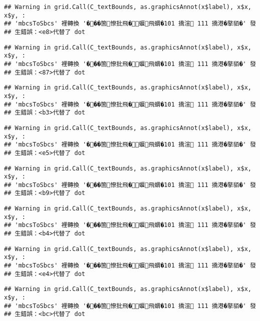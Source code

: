\documentclass[
]{article}
\begin{document}
\begin{verbatim}
## Warning in grid.Call(C_textBounds, as.graphicsAnnot(x$label), x$x, x$y, :
## 'mbcsToSbcs' 裡轉換 '���箇憭批飛�蝘飛蝟�101 撟渲 111 撟港�摮貊�' 發
## 生錯誤：<e8>代替了 dot
\end{verbatim}

\begin{verbatim}
## Warning in grid.Call(C_textBounds, as.graphicsAnnot(x$label), x$x, x$y, :
## 'mbcsToSbcs' 裡轉換 '���箇憭批飛�蝘飛蝟�101 撟渲 111 撟港�摮貊�' 發
## 生錯誤：<87>代替了 dot
\end{verbatim}

\begin{verbatim}
## Warning in grid.Call(C_textBounds, as.graphicsAnnot(x$label), x$x, x$y, :
## 'mbcsToSbcs' 裡轉換 '���箇憭批飛�蝘飛蝟�101 撟渲 111 撟港�摮貊�' 發
## 生錯誤：<b3>代替了 dot
\end{verbatim}

\begin{verbatim}
## Warning in grid.Call(C_textBounds, as.graphicsAnnot(x$label), x$x, x$y, :
## 'mbcsToSbcs' 裡轉換 '���箇憭批飛�蝘飛蝟�101 撟渲 111 撟港�摮貊�' 發
## 生錯誤：<e5>代替了 dot
\end{verbatim}

\begin{verbatim}
## Warning in grid.Call(C_textBounds, as.graphicsAnnot(x$label), x$x, x$y, :
## 'mbcsToSbcs' 裡轉換 '���箇憭批飛�蝘飛蝟�101 撟渲 111 撟港�摮貊�' 發
## 生錯誤：<b9>代替了 dot
\end{verbatim}

\begin{verbatim}
## Warning in grid.Call(C_textBounds, as.graphicsAnnot(x$label), x$x, x$y, :
## 'mbcsToSbcs' 裡轉換 '���箇憭批飛�蝘飛蝟�101 撟渲 111 撟港�摮貊�' 發
## 生錯誤：<b4>代替了 dot
\end{verbatim}

\begin{verbatim}
## Warning in grid.Call(C_textBounds, as.graphicsAnnot(x$label), x$x, x$y, :
## 'mbcsToSbcs' 裡轉換 '���箇憭批飛�蝘飛蝟�101 撟渲 111 撟港�摮貊�' 發
## 生錯誤：<e4>代替了 dot
\end{verbatim}

\begin{verbatim}
## Warning in grid.Call(C_textBounds, as.graphicsAnnot(x$label), x$x, x$y, :
## 'mbcsToSbcs' 裡轉換 '���箇憭批飛�蝘飛蝟�101 撟渲 111 撟港�摮貊�' 發
## 生錯誤：<bc>代替了 dot
\end{verbatim}
\end{document}
